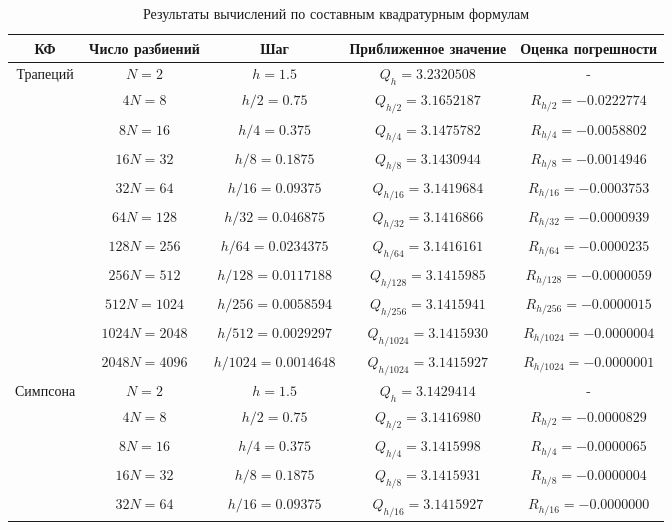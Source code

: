 \documentclass[12pt,a4paper]{article}
\begin{document}
\begin{table}[H]
\centering
\caption{Результаты вычислений по составным квадратурным формулам}
\begin{tabular}{|c|c|c|c|c|}
\hline
КФ & Число разбиений & Шаг & Приближенное значение & Оценка погрешности \\
\hline
\multirow{10}{*}{Трапеций} & $N=2$ & $h=1.5$ & $Q_h = 3.2320508$ & - \\
\cline{2-5}
& $4N=8$ & $h/2=0.75$ & $Q_{h/2} = 3.1652187$ & $R_{h/2} = -0.0222774$ \\
\cline{2-5}
& $8N=16$ & $h/4=0.375$ & $Q_{h/4} = 3.1475782$ & $R_{h/4} = -0.0058802$ \\
\cline{2-5}
& $16N=32$ & $h/8=0.1875$ & $Q_{h/8} = 3.1430944$ & $R_{h/8} = -0.0014946$ \\
\cline{2-5}
& $32N=64$ & $h/16=0.09375$ & $Q_{h/16} = 3.1419684$ & $R_{h/16} = -0.0003753$ \\
\cline{2-5}
& $64N=128$ & $h/32=0.046875$ & $Q_{h/32} = 3.1416866$ & $R_{h/32} = -0.0000939$ \\
\cline{2-5}
& $128N=256$ & $h/64=0.0234375$ & $Q_{h/64} = 3.1416161$ & $R_{h/64} = -0.0000235$ \\
\cline{2-5}
& $256N=512$ & $h/128=0.0117188$ & $Q_{h/128} = 3.1415985$ & $R_{h/128} = -0.0000059$ \\
\cline{2-5}
& $512N=1024$ & $h/256=0.0058594$ & $Q_{h/256} = 3.1415941$ & $R_{h/256} = -0.0000015$ \\
\cline{2-5}
& $1024N=2048$ & $h/512=0.0029297$ & $Q_{h/1024} = 3.1415930$ & $R_{h/1024} = -0.0000004$ \\
\cline{2-5}
& $2048N=4096$ & $h/1024=0.0014648$ & $Q_{h/1024} = 3.1415927$ & $R_{h/1024} = -0.0000001$ \\
\hline
\multirow{5}{*}{Симпсона} & $N=2$ & $h=1.5$ & $Q_h = 3.1429414$ & - \\
\cline{2-5}
& $4N=8$ & $h/2=0.75$ & $Q_{h/2} = 3.1416980$ & $R_{h/2} = -0.0000829$ \\
\cline{2-5}
& $8N=16$ & $h/4=0.375$ & $Q_{h/4} = 3.1415998$ & $R_{h/4} = -0.0000065$ \\
\cline{2-5}
& $16N=32$ & $h/8=0.1875$ & $Q_{h/8} = 3.1415931$ & $R_{h/8} = -0.0000004$ \\
\cline{2-5}
& $32N=64$ & $h/16=0.09375$ & $Q_{h/16} = 3.1415927$ & $R_{h/16} = -0.0000000$ \\
\hline
\end{tabular}
\end{table}
\end{document}
